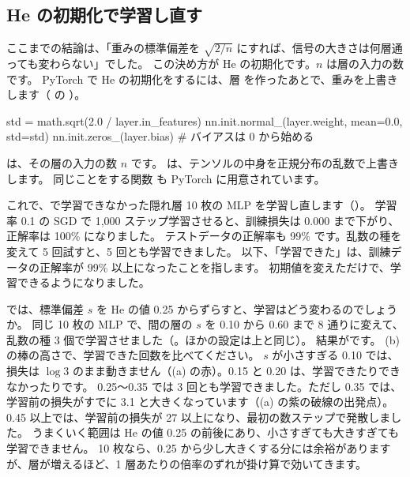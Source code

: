 \subsection*{He の初期化で学習し直す}

ここまでの結論は、「重みの標準偏差を $\sqrt{2/n}$ にすれば、信号の大きさは何層通っても変わらない」でした。
この決め方が He の初期化です。$n$ は層の入力の数です。
PyTorch で He の初期化をするには、層  を作ったあとで、重みを上書きします（ の ）。
\begin{pycode}
std = math.sqrt(2.0 / layer.in_features)
nn.init.normal_(layer.weight, mean=0.0, std=std)
nn.init.zeros_(layer.bias)       # バイアスは 0 から始める
\end{pycode}
 は、その層の入力の数 $n$ です。
 は、テンソルの中身を正規分布の乱数で上書きします。
同じことをする関数  も PyTorch に用意されています。

これで、で学習できなかった隠れ層 10 枚の MLP を学習し直します（）。
学習率 0.1 の SGD で 1,000 ステップ学習させると、訓練損失は 0.000 まで下がり、正解率は 100\% になりました。
テストデータの正解率も 99\% です。乱数の種を変えて 5 回試すと、5 回とも学習できました。
以下、「学習できた」は、訓練データの正解率が 99\% 以上になったことを指します。
初期値を変えただけで、学習できるようになりました。

では、標準偏差 $s$ を He の値 0.25 からずらすと、学習はどう変わるのでしょうか。
同じ 10 枚の MLP で、間の層の $s$ を 0.10 から 0.60 まで 8 通りに変えて、乱数の種 3 個で学習させました（。ほかの設定は上と同じ）。
結果がです。
(b) の棒の高さで、学習できた回数を比べてください。
$s$ が小さすぎる 0.10 では、損失は $\log 3$ のまま動きません（(a) の赤）。0.15 と 0.20 は、学習できたりできなかったりです。
0.25〜0.35 では 3 回とも学習できました。ただし 0.35 では、学習前の損失がすでに 3.1 と大きくなっています（(a) の紫の破線の出発点）。
0.45 以上では、学習前の損失が 27 以上になり、最初の数ステップで発散しました。
うまくいく範囲は He の値 0.25 の前後にあり、小さすぎても大きすぎても学習できません。
10 枚なら、0.25 から少し大きくする分には余裕がありますが、層が増えるほど、1 層あたりの倍率のずれが掛け算で効いてきます。

